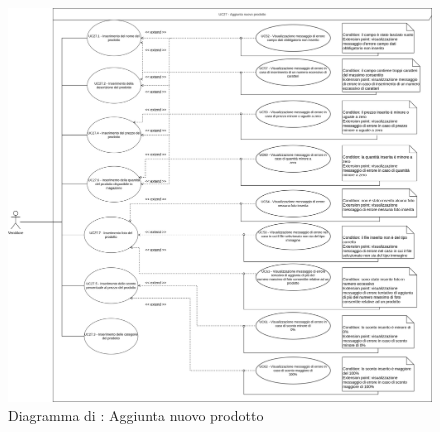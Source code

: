 \label{aggiunta-prodotto}

\begin{figure}[H]
    \centering
    \includegraphics[width=\textwidth]{Immagini/DiagrammiUC/Venditore/AggiuntaProdotto.png}
    \caption{Diagramma di \actualUC: Aggiunta nuovo prodotto}
    \label{fig:aggiunta-prodotto}
\end{figure}

